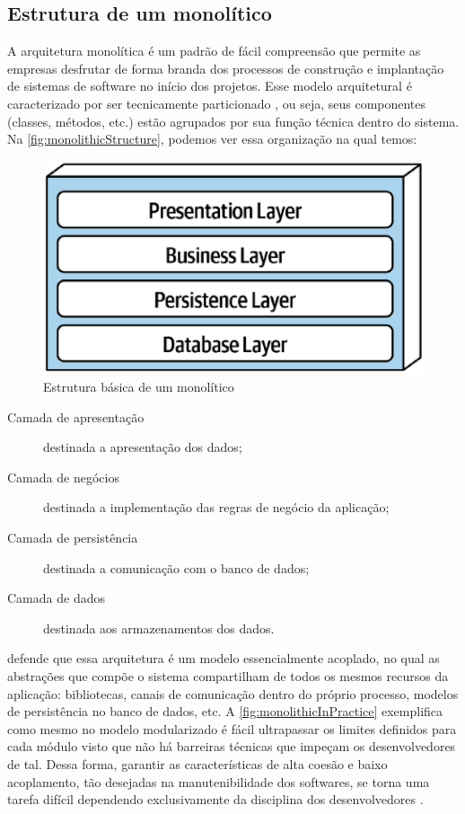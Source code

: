 \subsection{Estrutura de um monolítico}

A arquitetura monolítica é um padrão de fácil compreensão que permite as empresas desfrutar de forma
branda dos processos de construção e implantação de sistemas de software no início dos projetos.
Esse modelo arquitetural é caracterizado por ser tecnicamente particionado
\cite{Richards2020:FundamentalsOfSoftwareArchitecture}, ou seja, seus componentes
(classes, métodos, etc.) estão agrupados por sua função técnica dentro do sistema. Na
\autoref{fig:monolithicStructure}, podemos ver essa organização na qual temos:

\begin{figure}[h]
  \centering
  \includegraphics[keepaspectratio=true,scale=0.6]{figuras/monolitico.eps}
  \caption{Estrutura básica de um monolítico\label{fig:monolithicStructure} }
\end{figure}

\begin{description}
    \item [Camada de apresentação] destinada a apresentação dos dados;
    \item [Camada de negócios] destinada a implementação das regras de negócio da aplicação;
    \item [Camada de persistência] destinada a comunicação com o banco de dados;
    \item [Camada de dados] destinada aos armazenamentos dos dados.
\end{description}

 defende que essa arquitetura é um modelo
essencialmente acoplado, no qual as abstrações que compõe o sistema compartilham de todos os mesmos
recursos da aplicação: bibliotecas, canais de comunicação dentro do próprio processo, modelos de
persistência no banco de dados, etc. A \autoref{fig:monolithicInPractice} exemplifica como mesmo no
modelo modularizado é fácil ultrapassar os limites definidos para cada módulo visto que não há barreiras
técnicas que impeçam os desenvolvedores de tal. Dessa forma, garantir as características de alta coesão
e baixo acoplamento, tão desejadas na manutenibilidade dos softwares, se torna uma tarefa difícil dependendo
exclusivamente da disciplina dos desenvolvedores \cite{StefanTilkov:DontStartWithAMonolith,MartinFowler:MicroserviceTradeOffs}.

